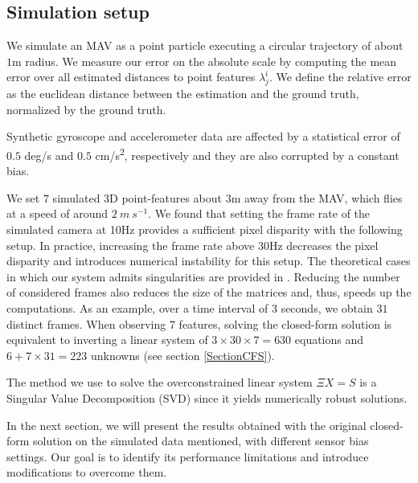 \documentclass[letterpaper, 10 pt, journal, twoside]{IEEEtran}  %
\begin{document}
\subsection{Simulation setup}\label{SubsectionConsidered}

We simulate an MAV as a point particle executing a circular trajectory of about $1$m radius.
We measure our error on the absolute scale by computing the mean error over all estimated distances to point features $\lambda_j^i$.
We define the relative error as the euclidean distance between the estimation and the ground truth,
normalized by the ground truth.

Synthetic gyroscope and accelerometer data are affected by a statistical error of $0.5$ deg/s and $0.5$ cm/s\textsuperscript{2}, respectively and they are also corrupted by a constant bias.

We set $7$ simulated 3D point-features about $3$m away from the MAV, which flies at a speed of around $2~m~s^{-1}$.
We found that setting the frame rate of the simulated camera at 10Hz provides a sufficient pixel disparity with the following setup.
In practice, increasing the frame rate above 30Hz decreases the pixel disparity and introduces numerical instability for this setup.
The theoretical cases in which our system admits singularities are provided in \cite{Martinelli2012, Martinelli2014}.
Reducing the number of considered frames also reduces the size of the matrices and, thus, speeds up the computations.
As an example, over a time interval of 3 seconds, we obtain $31$ distinct frames.
When observing 7 features, solving the closed-form solution is equivalent to inverting a linear system of $3\times 30\times 7 = 630$ equations and $6+7\times 31=223$ unknowns (see section \ref{SectionCFS}).

The method we use to solve the overconstrained linear system $\Xi X = S$ is a Singular Value Decomposition (SVD) since it yields numerically robust solutions.

In the next section, we will present the results obtained with the original closed-form solution on the simulated data mentioned, with different sensor bias settings.
Our goal is to identify its performance limitations and introduce modifications to overcome them.


\end{document}
